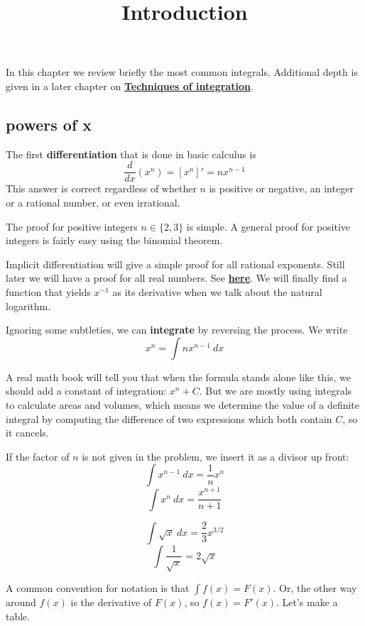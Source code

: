 \documentclass[11pt, oneside]{article}
\title{Introduction}
\date{}
\begin{document}
\maketitle
\Large

In this chapter we review briefly the most common integrals.  Additional depth is given in a later chapter on \hyperref[sec:Techniques_of_integration]{\textbf{Techniques of integration}}.

\subsection*{powers of x}
The first \textbf{differentiation} that is done in basic calculus is
\[ \frac{d}{dx} (x^n) = [x^n]' = n x^{n-1} \]
This answer is correct regardless of whether $n$ is positive or negative, an integer or a rational number, or even irrational. 

The proof for positive integers $n \in \{ 2, 3 \}$ is simple.  A general proof for positive integers is fairly easy using the binomial theorem.  

Implicit differentiation will give a simple proof for all rational exponents.  Still later we will have a proof for all real numbers.  See \hyperref[sec:Implicit_differentiation]{\textbf{here}}.  We will finally find a function that yields $x^{-1}$ as its derivative when we talk about the natural logarithm.
 
Ignoring some subtleties, we can \textbf{integrate} by reversing the process.  We write 
\[  x^n = \int n x^{n-1} \ dx \]

A real math book will tell you that when the formula stands alone like this, we should add a constant of integration:  $x^n + C$.  But we are mostly using integrals to calculate areas and volumes, which means we determine the value of a definite integral by computing the difference of two expressions which both contain $C$, so it cancels.  

If the factor of $n$ is not given in the problem, we insert it as a divisor up front:
\[  \int x^{n-1} \ dx = \frac{1}{n} x^n \]
\[  \int x^{n} \ dx = \frac{x^{n+1} }{n+1} \]
 
\[ \int \sqrt{x} \ dx = \frac{2}{3} x^{3/2} \]
\[ \int \frac{1}{\sqrt{x}} = 2 \sqrt{x} \]

A common convention for notation is that $\int f(x) = F(x)$.  Or, the other way around $f(x)$ is the derivative of $F(x)$, so $f(x) = F'(x)$.  Let's make a table.
\end{document}

